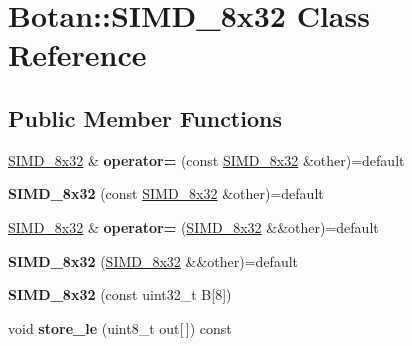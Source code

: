 \hypertarget{class_botan_1_1_s_i_m_d__8x32}{}\section{Botan\+:\+:S\+I\+M\+D\+\_\+8x32 Class Reference}
\label{class_botan_1_1_s_i_m_d__8x32}
\subsection*{Public Member Functions}
\begin{DoxyCompactItemize}
\item 
\mbox{\label{class_botan_1_1_s_i_m_d__8x32_a0ee99c84d771807650b9f4077e0edaac}} 
\mbox{\hyperlink{class_botan_1_1_s_i_m_d__8x32}{S\+I\+M\+D\+\_\+8x32}} \& {\bfseries operator=} (const \mbox{\hyperlink{class_botan_1_1_s_i_m_d__8x32}{S\+I\+M\+D\+\_\+8x32}} \&other)=default
\item 
\mbox{\label{class_botan_1_1_s_i_m_d__8x32_a09e4280289972461b794c6e235b26722}} 
{\bfseries S\+I\+M\+D\+\_\+8x32} (const \mbox{\hyperlink{class_botan_1_1_s_i_m_d__8x32}{S\+I\+M\+D\+\_\+8x32}} \&other)=default
\item 
\mbox{\label{class_botan_1_1_s_i_m_d__8x32_aba45f9470bff6311087db0191634781f}} 
\mbox{\hyperlink{class_botan_1_1_s_i_m_d__8x32}{S\+I\+M\+D\+\_\+8x32}} \& {\bfseries operator=} (\mbox{\hyperlink{class_botan_1_1_s_i_m_d__8x32}{S\+I\+M\+D\+\_\+8x32}} \&\&other)=default
\item 
\mbox{\label{class_botan_1_1_s_i_m_d__8x32_a556ad19a480ada8a26e0bb6a98309a7c}} 
{\bfseries S\+I\+M\+D\+\_\+8x32} (\mbox{\hyperlink{class_botan_1_1_s_i_m_d__8x32}{S\+I\+M\+D\+\_\+8x32}} \&\&other)=default
\item 
\mbox{\label{class_botan_1_1_s_i_m_d__8x32_a225b618ff8ac1a72dba9c01116babeb4}} 
{\bfseries S\+I\+M\+D\+\_\+8x32} (const uint32\+\_\+t B\mbox{[}8\mbox{]})
\item 
\mbox{\label{class_botan_1_1_s_i_m_d__8x32_a7bb1b469965bc76b7b8871d9b238315a}} 
void {\bfseries store\+\_\+le} (uint8\+\_\+t out\mbox{[}$\,$\mbox{]}) const

\end{DoxyCompactItemize}
